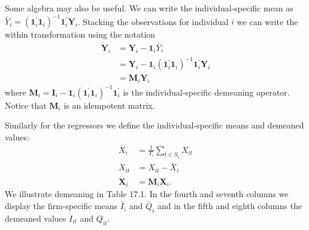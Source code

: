 \documentclass[10pt]{article}
\begin{document}
Some algebra may also be useful. We can write the individual-specific mean as $\bar{Y}_{i}=\left(\mathbf{1}_{i}^{\prime} \mathbf{1}_{i}\right)^{-1} \mathbf{1}_{i}^{\prime} \boldsymbol{Y}_{i}$. Stacking the observations for individual $i$ we can write the within transformation using the notation
$$
\begin{aligned}
\dot{\boldsymbol{Y}}_{i} &=\boldsymbol{Y}_{i}-\mathbf{1}_{i} \bar{Y}_{i} \\
&=\boldsymbol{Y}_{i}-\mathbf{1}_{i}\left(\mathbf{1}_{i}^{\prime} \mathbf{1}_{i}\right)^{-1} \mathbf{1}_{i}^{\prime} \boldsymbol{Y}_{i} \\
&=\boldsymbol{M}_{i} \boldsymbol{Y}_{i}
\end{aligned}
$$
where $\boldsymbol{M}_{i}=\boldsymbol{I}_{i}-\mathbf{1}_{i}\left(\mathbf{1}_{i}^{\prime} \mathbf{1}_{i}\right)^{-1} \mathbf{1}_{i}^{\prime}$ is the individual-specific demeaning operator. Notice that $\boldsymbol{M}_{i}$ is an idempotent matrix.

Similarly for the regressors we define the individual-specific means and demeaned values:
$$
\begin{aligned}
\bar{X}_{i} &=\frac{1}{T_{i}} \sum_{t \in S_{i}} X_{i t} \\
\dot{X}_{i t} &=X_{i t}-\bar{X}_{i} \\
\dot{\boldsymbol{X}}_{i} &=\boldsymbol{M}_{i} \boldsymbol{X}_{i} .
\end{aligned}
$$
We illustrate demeaning in Table 17.1. In the fourth and seventh columns we display the firm-specific means $\bar{I}_{i}$ and $\bar{Q}_{i}$ and in the fifth and eighth columns the demeaned values $\dot{I}_{i t}$ and $\dot{Q}_{i t}$.
\end{document}
